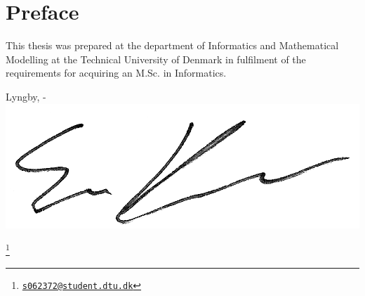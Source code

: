 \chapter{Preface}

This thesis was prepared at the department of Informatics and Mathematical
Modelling at the Technical University of Denmark in fulfilment of the
requirements for acquiring an M.Sc. in Informatics.
\vspace{20mm}
\begin{center}
    \hspace{20mm} Lyngby, \thesishandin-\thesisyear
    \vspace{5mm}
    \newline
    \includegraphics[scale=0.095]{figures/Signature}
\end{center}
\begin{flushright}
    \thesisauthor\footnote{\href{mailto:s062372@student.dtu.dk}{\nolinkurl{s062372@student.dtu.dk}}}
\end{flushright}
